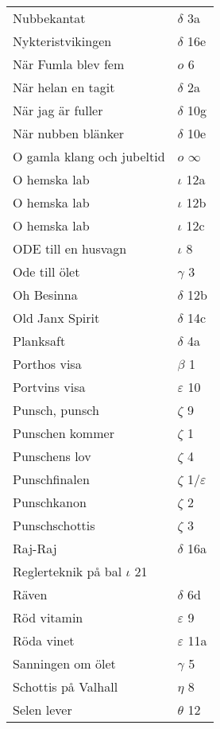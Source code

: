 \documentclass[a6paper,10pt]{article}
\begin{document}
\newpage
\begin{table}[!h]
\begin{tabular}{l l}
Nubbekantat&	$\delta$ 3a\\
Nykteristvikingen&  $\delta$ 16e\\
När Fumla blev fem&  $o$ 6\\
När helan en tagit	&$\delta$ 2a\\
När jag är fuller&	$\delta$ 10g\\
När nubben blänker&	$\delta$ 10e\\
O gamla klang och jubeltid&	$o$ $\infty$\\
O hemska lab&	$\iota$ 12a\\
O hemska lab&	$\iota$ 12b\\
O hemska lab&	$\iota$ 12c\\
ODE till en husvagn	&$\iota$ 8\\
Ode till ölet&	$\gamma$ 3\\
Oh Besinna&	$\delta$ 12b\\
Old Janx Spirit&	$\delta$ 14c\\
Planksaft	&$\delta$ 4a\\
Porthos visa&	$\beta$ 1\\
Portvins visa	&$\varepsilon$ 10\\
Punsch, punsch	&$\zeta$ 9\\
Punschen kommer&	$\zeta$ 1\\
Punschens lov&	$\zeta$ 4\\
Punschfinalen	&$\zeta$ 1/$\varepsilon$\\
Punschkanon&	$\zeta$ 2\\
Punschschottis	&$\zeta$ 3\\
Raj-Raj&	$\delta$ 16a\\
Reglerteknik på bal $\iota$ 21\\
Räven&	$\delta$ 6d\\
Röd vitamin	&$\varepsilon$ 9\\
Röda vinet&	$\varepsilon$ 11a\\
Sanningen om ölet&	$\gamma$ 5\\
Schottis på Valhall&	$\eta$ 8\\
Selen lever	&$\theta$ 12\\
\end{tabular}
\end{table}
\end{document}
